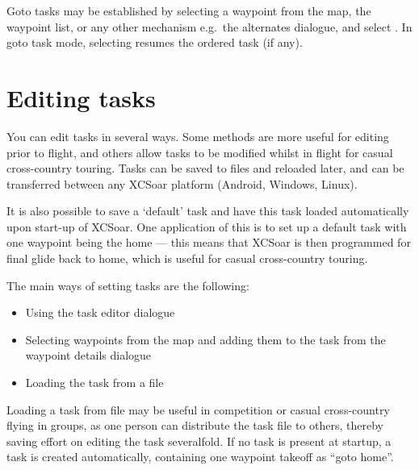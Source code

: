 Goto tasks may be established by selecting a waypoint from the map,
the waypoint list, or any other mechanism e.g.\ the alternates dialogue,
and select . In goto task mode, selecting
\blink{} resumes the ordered task (if
any).

\section{Editing tasks}

You can edit tasks in several ways.  Some methods are more useful for
editing prior to flight, and others allow tasks to be modified whilst
in flight for casual cross-country touring.  Tasks can be saved to
files and reloaded later, and can be transferred between any XCSoar
platform (Android, Windows, Linux\textellipsis).

\tip{} It is also possible to save a `default' task and have this task loaded
automatically upon start-up of XCSoar.  One application of this is to
set up a default task with one waypoint being the home --- this means
that XCSoar is then programmed for final glide back to home, which is
useful for casual cross-country touring.

The main ways of setting tasks are the following:
\begin{itemize}
\item Using the task editor dialogue
\item Selecting waypoints from the map and adding them to the task from the
 waypoint details dialogue
\item Loading the task from a file
\end{itemize}

%

Loading a task from file may be useful in competition or casual
cross-country flying in groups, as one person can distribute the task
file to others, thereby saving effort on editing the task severalfold.
\tip{}
If no task is present at startup, a task is created automatically,
containing one waypoint takeoff as ``goto home''.

